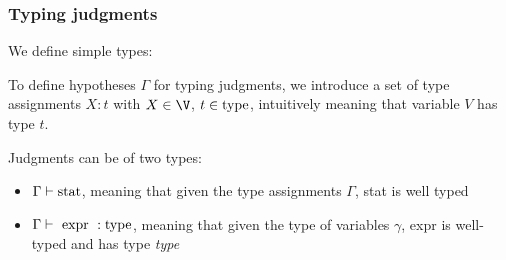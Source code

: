 \documentclass[toc, titlepaged]{../cs-classes/cs-classes}
\newcommand*{\expr}{\textnormal{ expr }}
\begin{document}
\subsubsection{Typing judgments}
We define simple types:
\begin{figure}[H]
    \centering
    \begin{grammar}
    \end{grammar}
\end{figure}

To define hypotheses $\Gamma$ for typing judgments, we introduce a set of type assignments $X : t$ with $X\in\V$, $t\in\textnormal{type}$, intuitively meaning that variable $V$ has type $t$.

Judgments can be of two types:
\begin{itemize}
    \item $\Gamma\vdash \textnormal{stat}$, meaning that given the type assignments $\Gamma$, stat is well typed
    \item $\Gamma\vdash \expr : \textnormal{type}$, meaning that given the type of variables $\gamma$, expr is well-typed and has type \emph{type}
\end{itemize}
\end{document}
